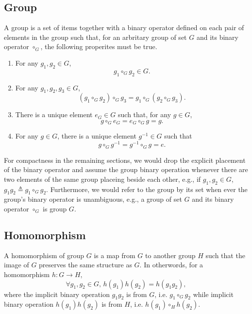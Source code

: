 \documentclass[preprint, 12pt]{revtex4-2}
\numberwithin{equation}{section}
\begin{document}
\subsection{Group}
A group is a set of items together with a binary operator defined on each pair of elements in the group such that, for an arbritary group of set $G$ and its binary operator $\circ_G$, the following properites must be true.
\begin{enumerate}
    \item For any $g_1, g_2\in G$,
        \begin{equation}\label{eq:group_closed}
            g_1\circ_G g_2\in G.
        \end{equation}
    \item For any $g_1, g_2, g_3\in G$, 
        \begin{equation}\label{eq:group_associative}
            (g_1\circ_G g_2)\circ_G g_3 = g_1\circ_G(g_2\circ_G g_3).
        \end{equation}
    \item There is a unique element $e_G\in G$ such that, for any $g\in G$,
        \begin{equation}\label{eq:group_identity}
            g\circ_G e_G=e_G\circ_G g=g.
        \end{equation}
    \item For any $g\in G$, there is a unique element $g^{-1}\in G$ such that 
        \begin{equation}\label{eq:group_inverse}
            g\circ_G g^{-1}=g^{-1}\circ_G g=e.
        \end{equation}
\end{enumerate}

For compactness in the remaining sections, we would drop the explicit placement of the binary operator and assume the group binary operation whenever there are two elements of the same group placeing beside each other, e.g., if $g_1, g_2\in G$, $g_1g_2\triangleq g_1\circ_G g_2$. Furthermore, we would refer to the group by its set when ever the group's binary operator is unambiguous, e.g., a group of set $G$ and its binary operator $\circ_G$ is group $G$.

\subsection{Homomorphism}
A homomorphism of group $G$ is a map from $G$ to another group $H$ such that the image of $G$ preserves the same structure as $G$. In otherwords, for a homomorphism $h:G\rightarrow H$,
\begin{equation}\label{eq:homomorphism}
    \forall g_1, g_2\in G,\, h(g_1)h(g_2) = h(g_1g_2),
\end{equation}
where the implicit binary operation $g_1g_2$ is from $G$, i.e. $g_1\circ_G g_2$ while implicit binary operation $h(g_1)h(g_2)$ is from $H$, i.e. $h(g_1)\circ_H h(g_2)$.
\end{document}
